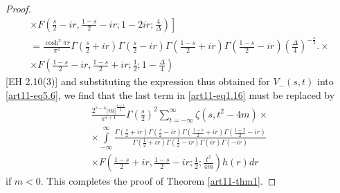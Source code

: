 \begin{proof}
\begin{gather*}
\left. \times F \left(\frac{s}{2}  - ir, \frac{1-s}{2} - ir; 1 - 2 ir; \frac{4}{\Delta} \right)  \right]\\
=\frac{\cosh^2 \pi r}{\pi^2} \Gamma \left(\frac{s}{2} + ir \right) \Gamma \left(\frac{s}{2}  - ir \right) \Gamma\left(\frac{1-s}{2} + ir  \right) \Gamma \left(\frac{1-s}{2} -ir \right) \left(\frac{\Delta}{4} \right)^{-\frac{s}{2}}. \times \\
\times F \left( \frac{1-s}{2} - ir, \frac{1-s}{2} +ir; \frac{1}{2} ; 1 -\frac{\Delta}{4}\right)
\end{gather*}
[EH 2.10(3)] and substituting the expression thus obtained for $V_-(s,t)$ into \eqref{art11-eq5.6}, we find that the last term in \eqref{art11-eq1.16} must be replaced by
\begin{gather*}
\frac{2^{s-4}  |m|^{\frac{s-1}{2}}}{\pi^{s+1}} \Gamma \left(\frac{s}{2} \right)^2 \sum\limits^\infty_{t = - \infty} \zeta (s, t^2 - 4 m) \times \\
\times \int\limits^\infty_{-\infty} \frac{\Gamma \left(\frac{s}{2} + ir \right) \Gamma \left(\frac{s}{2} - ir \right) \Gamma \left(\frac{1-s}{2} + ir \right) \Gamma \left(\frac{1-2}{2} - ir \right)}{\Gamma \left(\frac{1}{2} + ir \right) \Gamma\left(\frac{1}{2} - ir \right) \Gamma (ir) \Gamma (-ir)} \\
\times F \left(\frac{1-s}{2} + ir, \frac{1-s}{2} - ir ; \frac{1}{2} ; \frac{t^2}{4 m} \right) h (r) dr
\end{gather*}
if $m <0$. This completes the proof of Theorem \eqref{art11-thm1}.


\end{proof}
